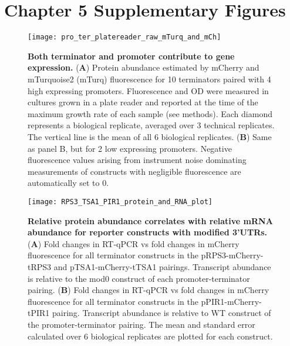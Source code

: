 \documentclass[../main.tex]{subfiles}
\begin{document}
\newpage
\FloatBarrier
\section{Chapter 5 Supplementary Figures}

\begin{figure}[bh!]
\texttt{[image: pro\_ter\_platereader\_raw\_mTurq\_and\_mCh]} \caption[Both terminator and promoter contribute to gene expression.]{\textbf{Both terminator and promoter contribute to gene expression.} (\textbf{A}) Protein abundance estimated by mCherry and mTurquoise2 (mTurq) fluorescence for 10 terminators paired with 4 high expressing promoters. Fluorescence and OD were measured in cultures grown in a plate reader and reported at the time of the maximum growth rate of each sample (see methods). Each diamond represents a biological replicate, averaged over 3 technical replicates.  The vertical line is the mean of all 6 biological replicates. (\textbf{B}) Same as panel B, but for 2 low expressing promoters. Negative fluorescence values arising from instrument noise dominating measurements of constructs with negligible fluorescence are automatically set to 0.}\label{fig:raw-pro-ter-swap-protein-fluo}
\end{figure}

\begin{figure}[ph!]

{\centering \texttt{[image: RPS3\_TSA1\_PIR1\_protein\_and\_RNA\_plot]} 

}

\caption[Relative protein abundance correlates with relative mRNA abundance for reporter constructs with modified 3'UTRs.]{\textbf{Relative protein abundance correlates with relative mRNA abundance for reporter constructs with modified 3'UTRs.} (\textbf{A}) Fold changes in RT-qPCR vs fold changes in mCherry fluorescence for all terminator constructs in the pRPS3-mCherry-tRPS3 and pTSA1-mCherry-tTSA1 pairings. Transcript abundance is relative to the mod0 construct of each promoter-terminator pairing. (\textbf{B}) Fold changes in RT-qPCR vs fold changes in mCherry fluorescence for all terminator constructs in the pPIR1-mCherry-tPIR1 pairing. Transcript abundance is relative to WT construct of the promoter-terminator pairing. The mean and standard error calculated over 6 biological replicates are plotted for each construct.}\label{fig:protein-vs-RNA-plot-motifs}
\end{figure}
\end{document}

